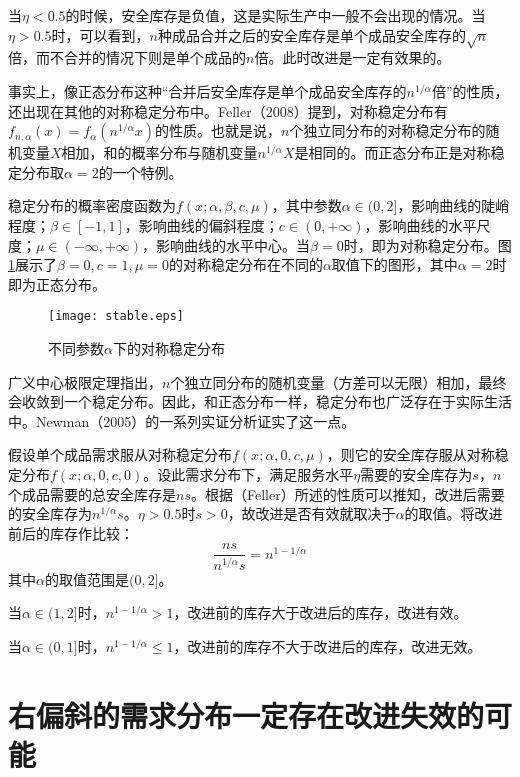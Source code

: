 当$\eta<0.5$的时候，安全库存是负值，这是实际生产中一般不会出现的情况。当$\eta>0.5$时，可以看到，$n$种成品合并之后的安全库存是单个成品安全库存的$\sqrt{n}$倍，而不合并的情况下则是单个成品的$n$倍。此时改进是一定有效果的。

事实上，像正态分布这种“合并后安全库存是单个成品安全库存的$n^{1/\alpha}$倍”的性质，还出现在其他的对称稳定分布中。Feller（2008）\cite{feller_introduction_2008}提到，对称稳定分布有$f_{n,\alpha}(x)=f_\alpha(n^{1/\alpha}x)$的性质。也就是说，$n$个独立同分布的对称稳定分布的随机变量$X$相加，和的概率分布与随机变量$n^{1/\alpha}X$是相同的。而正态分布正是对称稳定分布取$\alpha=2$的一个特例。

稳定分布的概率密度函数为$f(x;\alpha,\beta,c,\mu)$，其中参数$\alpha\in(0,2]$，影响曲线的陡峭程度；$\beta\in[-1,1]$，影响曲线的偏斜程度；$c\in(0,+\infty)$，影响曲线的水平尺度；$\mu\in(-\infty,+\infty)$，影响曲线的水平中心。当$\beta=0$时，即为对称稳定分布。图
\ref{fig:对称稳定分布}展示了$\beta=0,c=1,\mu=0$的对称稳定分布在不同的$\alpha$取值下的图形，其中$\alpha=2$时即为正态分布。

\begin{figure}[htb]
\centering
\texttt{[image: stable.eps]}
\caption{不同参数$\alpha$下的对称稳定分布}
\label{fig:对称稳定分布}
\end{figure}

广义中心极限定理指出，$n$个独立同分布的随机变量（方差可以无限）相加，最终会收敛到一个稳定分布。因此，和正态分布一样，稳定分布也广泛存在于实际生活中。Newman（2005）\cite{newman_power_2005}的一系列实证分析证实了这一点。

假设单个成品需求服从对称稳定分布$f(x;\alpha,0,c,\mu)$，则它的安全库存服从对称稳定分布$f(x;\alpha,0,c,0)$。设此需求分布下，满足服务水平$\eta$需要的安全库存为$s$，$n$个成品需要的总安全库存是$ns$。根据（Feller）所述的性质可以推知，改进后需要的安全库存为$n^{1/\alpha}s$。$\eta>0.5$时$s>0$，故改进是否有效就取决于$\alpha$的取值。将改进前后的库存作比较：
\[
\frac{ns}{n^{1/\alpha}s} = n^{1-1/\alpha}
\]
其中$\alpha$的取值范围是$(0,2]$。

当$\alpha\in(1,2]$时，$n^{1-1/\alpha}>1$，改进前的库存大于改进后的库存，改进有效。

当$\alpha\in(0,1]$时，$n^{1-1/\alpha}\leq 1$，改进前的库存不大于改进后的库存，改进无效。









\section{右偏斜的需求分布一定存在改进失效的可能}

